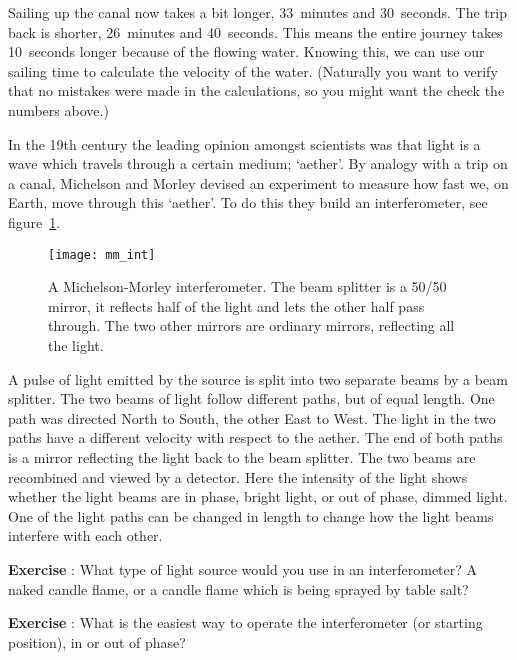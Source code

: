 Sailing up the canal now takes a bit longer, 33~minutes and 30~seconds. The trip back is shorter, 26~minutes and 40~seconds. This means the entire journey takes 10~seconds longer because of the flowing water. Knowing this, we can use our sailing time to calculate the velocity of the water. (Naturally you want to verify that no mistakes were made in the calculations, so you might want the check the numbers above.)

In the 19th century the leading opinion amongst scientists was that light is a wave which travels through a certain medium; `aether'. By analogy with a trip on a canal, Michelson and Morley devised an experiment to measure how fast we, on Earth, move through this `aether'. To do this they build an interferometer, see figure~\ref{fig:mm_int}.

\begin{figure}\begin{center}
\texttt{[image: mm\_int]}
\caption{A Michelson-Morley interferometer. The beam splitter is a 50/50 mirror, it reflects half of the light and lets the other half pass through. The two other mirrors are ordinary mirrors, reflecting all the light.}\label{fig:mm_int}
\end{center}\end{figure}

A pulse of light emitted by the source is split into two separate beams by a beam splitter. The two beams of light follow different paths, but of equal length. One path was directed North to South, the other East to West. The light in the two paths have a different velocity with respect to the aether. The end of both paths is a mirror reflecting the light back to the beam splitter. The two beams are recombined and viewed by a detector. Here the intensity of the light shows whether the light beams are in phase, bright light, or out of phase,  dimmed light. One of the light paths can be changed in length to change how the light beams interfere with each other.

\begin{shaded}
\textbf{Exercise \theExercise {}} : What type of light source would you use in an interferometer? A naked candle flame, or a candle flame which is being sprayed by table salt?\footnotemark \end{shaded}

\begin{shaded}
\textbf{Exercise \theExercise {}} : What is the easiest way to operate the interferometer (or starting position), in or out of phase?\end{shaded}

